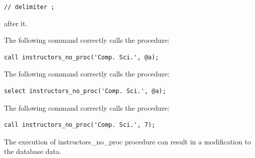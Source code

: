 \documentclass[12pt]{exam}
\begin{document}
\begin{questions}
\begin{minipage}{\linewidth}
{\texttt{// delimiter ;}

after it.}

\par\vspace{0.5em}

\begin{checkboxes}
    \CorrectChoice The following command correctly calls the procedure:
    \begin{verbatim}
call instructors_no_proc('Comp. Sci.', @a);
    \end{verbatim}

    \choice The following command correctly calls the procedure:
    \begin{verbatim}
select instructors_no_proc('Comp. Sci.', @a);
    \end{verbatim}

    \choice The following command correctly calls the procedure:
    \begin{verbatim}
call instructors_no_proc('Comp. Sci.', 7);
    \end{verbatim}

    \choice The execution of instructors\_no\_proc procedure can result in a modification to the database data.
\end{checkboxes}
\end{minipage}\vspace{1em}

\end{questions}
\end{document}
